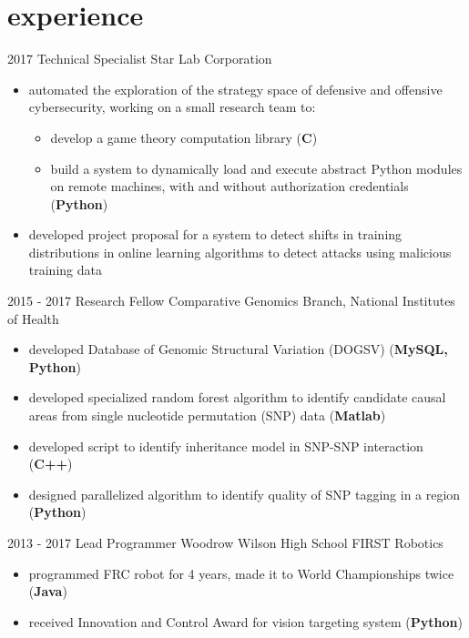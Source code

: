\documentclass[]{friggeri-cv}
\begin{document}
\section{experience}
\begin{entrylist}
  \entry
    {2017}
    {Technical Specialist}
    {Star Lab Corporation}
    {\vspace{-4mm} 
     \begin{itemize}
	      \item automated the exploration of the strategy space of defensive and offensive cybersecurity, working on a small research team to: 
	    	\begin{itemize}
	    	    \item develop a game theory computation library (\textbf{C})
	      		\item build a system to dynamically load and execute abstract Python modules on remote machines, with and without authorization credentials (\textbf{Python})
	    	\end{itemize}
	       \item developed project proposal for a system to detect shifts in training distributions in online learning algorithms to detect attacks using malicious training data
     \end{itemize}}
     \vspace{2mm}
  \entry
    {2015 - 2017}
    {Research Fellow}
    {Comparative Genomics Branch, National Institutes of Health}
    {\vspace{-4mm} 
     \begin{itemize}
     	  \item developed Database of Genomic Structural Variation (DOGSV) (\textbf{MySQL, Python})
	      \item developed specialized random forest algorithm to identify candidate causal areas from single nucleotide permutation (SNP) data (\textbf{Matlab})
	      \item developed script to identify inheritance model in SNP-SNP interaction (\textbf{C++})
          \item designed parallelized algorithm to identify quality of SNP tagging in a region  (\textbf{Python})
     \end{itemize}}
     \vspace{2mm}
  \entry
    {2013 - 2017}
    {Lead Programmer}
    {Woodrow Wilson High School FIRST Robotics}
    {\vspace{-4mm} 
     \begin{itemize}
     	  \item programmed FRC robot for 4 years, made it to World Championships twice (\textbf{Java})
     	  \item received Innovation and Control Award for vision targeting system (\textbf{Python})
     \end{itemize}}
     
\end{entrylist}
\vspace{-1mm} 
\end{document}
